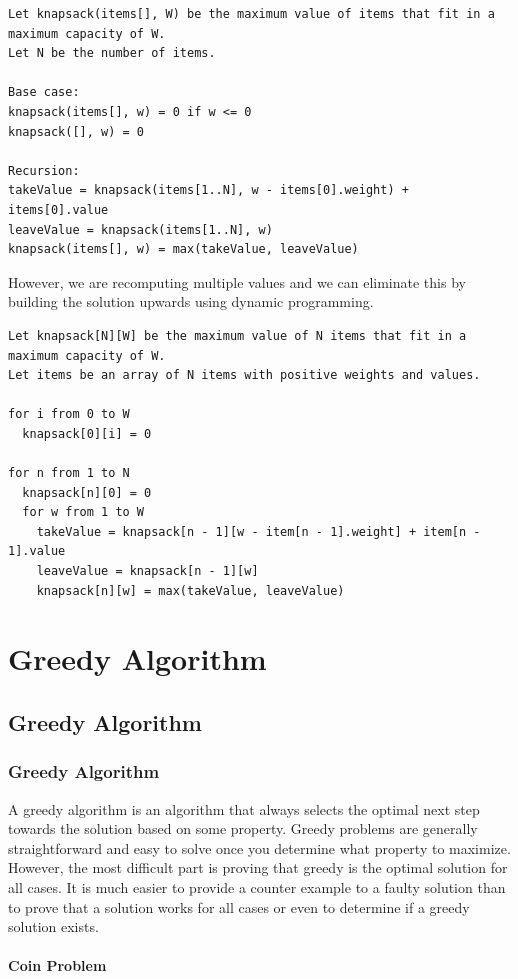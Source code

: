 \documentclass[11pt,oneside]{book}
\begin{document}
\begin{lstlisting}
Let knapsack(items[], W) be the maximum value of items that fit in a maximum capacity of W.
Let N be the number of items.

Base case:
knapsack(items[], w) = 0 if w <= 0
knapsack([], w) = 0

Recursion:
takeValue = knapsack(items[1..N], w - items[0].weight) + items[0].value
leaveValue = knapsack(items[1..N], w)
knapsack(items[], w) = max(takeValue, leaveValue)
\end{lstlisting}

However, we are recomputing multiple values and we can eliminate this by building the solution upwards using dynamic programming.

\begin{lstlisting}
Let knapsack[N][W] be the maximum value of N items that fit in a maximum capacity of W.
Let items be an array of N items with positive weights and values.

for i from 0 to W
  knapsack[0][i] = 0

for n from 1 to N
  knapsack[n][0] = 0
  for w from 1 to W
    takeValue = knapsack[n - 1][w - item[n - 1].weight] + item[n - 1].value
    leaveValue = knapsack[n - 1][w]
    knapsack[n][w] = max(takeValue, leaveValue)
\end{lstlisting}

\part{ Greedy Algorithm }
    \chapter{ Greedy Algorithm }
        \section{ Greedy Algorithm }
        

A greedy algorithm is an algorithm that always selects the optimal next step towards the solution based on some property. Greedy problems are generally straightforward and easy to solve once you determine what property to maximize. However, the most difficult part is proving that greedy is the optimal solution for all cases. It is much easier to provide a counter example to a faulty solution than to prove that a solution works for all cases or even to determine if a greedy solution exists.

\subsection{Coin Problem}
\end{document}
